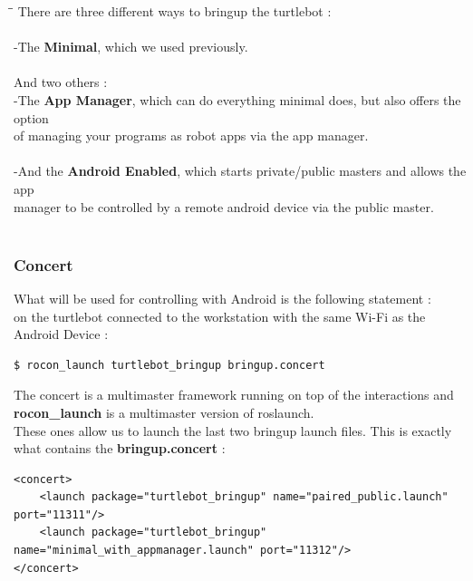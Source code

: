\documentclass[10pt,a4paper]{article}
\begin{document}
\begin{tabbing}
\hspace{1cm}\=\hspace{1cm}\=\kill
There are three different ways to bringup the turtlebot :\\\\

\> -The \textbf{Minimal}, which we used previously.\\\\



 And two others : \\
\> -The \textbf{App Manager}, which can do everything minimal does, but also offers the option \\ of managing your programs as robot apps via the app manager.\\\\

\> -And the \textbf{Android Enabled}, which starts private/public masters and allows the app \\ manager to be controlled by a remote android device via the public master.\\\\
\end{tabbing}

\subsubsection{Concert}

What will be used for controlling with Android is the following statement : \\
on the turtlebot connected to the workstation with the same Wi-Fi as the Android Device : 
\begin{lstlisting}[frame=single]
$ rocon_launch turtlebot_bringup bringup.concert
\end{lstlisting}


 The concert is a multimaster framework running on top of the interactions and \textbf{rocon\_launch} is a multimaster version of roslaunch.\\
 
These ones allow us to launch the last two bringup launch files.
This is exactly what contains the \textbf{bringup.concert} : 
\begin{lstlisting}[frame=single]
<concert>
    <launch package="turtlebot_bringup" name="paired_public.launch" port="11311"/>
    <launch package="turtlebot_bringup" name="minimal_with_appmanager.launch" port="11312"/>
</concert>
\end{lstlisting}
\end{document}
